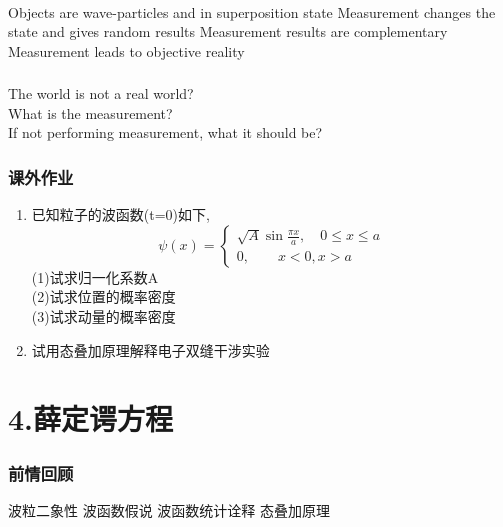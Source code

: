  \begin{frame}
     \begin{tcolorbox4}[Conclusion]
         ~~\\
     \begin{enumerate}
         \Item Objects are wave-particles and in superposition state
         \Item Measurement changes the state and gives random results
         \Item Measurement results are complementary
         \Item Measurement leads to objective reality
     \end{enumerate}
     \end{tcolorbox4}
 \end{frame}
 
 \begin{frame}
     \frametitle{}
     \centering
     {
       \large  {The world is not a real world?\\
       What is the measurement? \\
       If not performing measurement, what it should be?}
     }
 \end{frame}
 
  \begin{frame}
     \frametitle{课外作业}
     \begin{enumerate}
        \item 已知粒子的波函数(t=0)如下,
            \[\psi(x) = \begin{cases}
              \sqrt{A}\sin \frac{\pi x}{a}, \quad 0\leq x\leq a\\
              0, \qquad  x<0, x>a
            \end{cases}\]
                (1)试求归一化系数A \\
                (2)试求位置的概率密度 \\
                (3)试求动量的概率密度
        \item 试用态叠加原理解释电子双缝干涉实验
     \end{enumerate}
 \end{frame}
 

\section{4.薛定谔方程}

\begin{frame}
    \frametitle{前情回顾}
    \begin{itemize}
        \Item 波粒二象性
        \Item 波函数假说
        \Item 波函数统计诠释
        \Item 态叠加原理
    \end{itemize}
\end{frame}  

